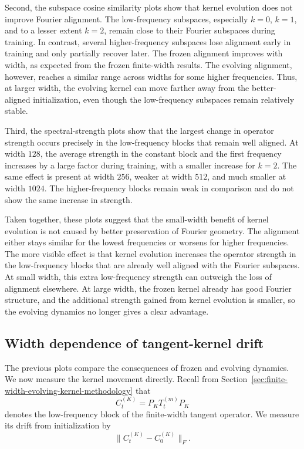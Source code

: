 Second, the subspace cosine similarity plots show that kernel evolution does
not improve Fourier alignment. The low-frequency subspaces, especially
\(k=0\), \(k=1\), and to a lesser extent \(k=2\), remain close to their Fourier
subspaces during training. In contrast, several higher-frequency subspaces lose
alignment early in training and only partially recover later. The frozen
alignment improves with width, as expected from the frozen finite-width results.
The evolving alignment, however, reaches a similar range across widths for some
higher frequencies. Thus, at larger width, the evolving kernel can move farther
away from the better-aligned initialization, even though the low-frequency
subspaces remain relatively stable.

Third, the spectral-strength plots show that the largest change in operator
strength occurs precisely in the low-frequency blocks that remain well aligned.
At width \(128\), the average strength in the constant block and the first
frequency increases by a large factor during training, with a smaller increase
for \(k=2\). The same effect is present at width \(256\), weaker at width
\(512\), and much smaller at width \(1024\). The higher-frequency blocks remain
weak in comparison and do not show the same increase in strength.

Taken together, these plots suggest that the small-width benefit of kernel
evolution is not caused by better preservation of Fourier geometry. The
alignment either stays similar for the lowest frequencies or worsens for higher
frequencies. The more visible effect is that kernel evolution increases the
operator strength in the low-frequency blocks that are already well aligned
with the Fourier subspaces. At small width, this extra low-frequency strength
can outweigh the loss of alignment elsewhere. At large width, the frozen kernel
already has good Fourier structure, and the additional strength gained from
kernel evolution is smaller, so the evolving dynamics no longer gives a clear
advantage.

\subsection{Width dependence of tangent-kernel drift}
\label{subsec:results-evolving-block-drift}

The previous plots compare the consequences of frozen and evolving dynamics.
We now measure the kernel movement directly. Recall from
Section~\ref{sec:finite-width-evolving-kernel-methodology} that
\[
	C_t^{(K)}=P_KT_t^{(m)}P_K
\]
denotes the low-frequency block of the finite-width tangent operator. We measure
its drift from initialization by
\[
	\|C_t^{(K)}-C_0^{(K)}\|_F .
\]

